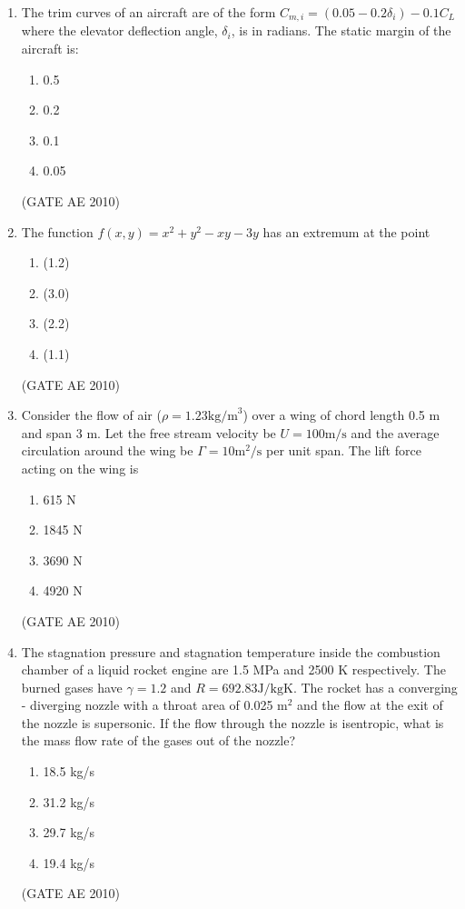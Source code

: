 \documentclass[journal]{IEEEtran}
\begin{document}
\begin{enumerate}
\item The trim curves of an aircraft are of the form $ C_{m, i} = (0.05 - 0.2 \delta_i) - 0.1C_L $ where the elevator deflection angle, $\delta_i$, is in radians. The static margin of the aircraft is:
\begin{multicols}{4}
\begin{enumerate}
\item 0.5
\item 0.2
\item 0.1
\item 0.05
\end{enumerate}
\end{multicols}
\hfill (GATE AE 2010)

\item The function $ f(x, y) = x^2 + y^2 - xy - 3y $ has an extremum at the point
\begin{multicols}{4}
\begin{enumerate}
\item (1.2)
\item (3.0)
\item (2.2)
\item (1.1)
\end{enumerate}
\end{multicols}
\hfill (GATE AE 2010)

\item Consider the flow of air ($ \rho = 1.23  \text{kg/m}^3 $) over a wing of chord length 0.5 m and span 3 m. Let the free stream velocity be $ U = 100  \text{m/s} $ and the average circulation around the wing be $ \Gamma = 10  \text{m}^2/\text{s} $ per unit span. The lift force acting on the wing is
\begin{multicols}{4}
\begin{enumerate}
\item 615 N
\item 1845 N
\item 3690 N
\item 4920 N
\end{enumerate}
\end{multicols}
\hfill (GATE AE 2010)

\item The stagnation pressure and stagnation temperature inside the combustion chamber of a liquid rocket engine are 1.5 MPa and 2500 K respectively. The burned gases have $ \gamma = 1.2 $ and $ R = 692.83  \text{J/kgK} $. The rocket has a converging - diverging nozzle with a throat area of 0.025 $ \text{m}^2 $ and the flow at the exit of the nozzle is supersonic. If the flow through the nozzle is isentropic, what is the mass flow rate of the gases out of the nozzle?
\begin{multicols}{4}
\begin{enumerate}
\item 18.5 kg/s
\item 31.2 kg/s
\item 29.7 kg/s
\item 19.4 kg/s
\end{enumerate}
\end{multicols}
\hfill (GATE AE 2010)


\end{enumerate}
\end{document}
